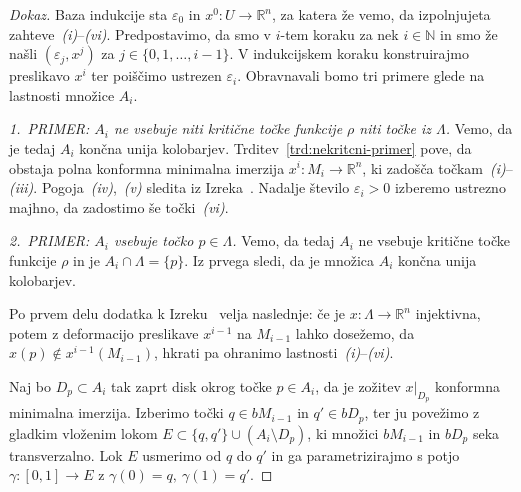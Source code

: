 \documentclass[12pt,a4paper,twoside]{article}
\theoremstyle{definition} %
\newenvironment{dokaz}[1][Dokaz]{\begin{proof}[#1]}{\end{proof}}
\theoremstyle{plain} %
\numberwithin{equation}{section}  %
\begin{document}
\begin{dokaz}
Baza indukcije sta $\varepsilon_0$ in $x^{0} \colon U \to \mathbb{R}^{n}$, za katera že vemo, da izpolnjujeta zahteve~\textit{(i)}--\textit{(vi)}. \newline
Predpostavimo, da smo v $i$-tem koraku za nek $i \in \mathbb{N}$ in smo že našli $(\varepsilon_{j}, x^{j})$ za $j \in \{ 0, 1, \dots , i-1 \}$. V indukcijskem koraku konstruirajmo preslikavo $x^{i}$ ter poiščimo ustrezen $\varepsilon_{i}$.
Obravnavali bomo tri primere glede na lastnosti množice $A_{i}$. \newline

\textit{1.~PRIMER: $A_{i}$ ne vsebuje niti kritične točke funkcije $\rho$ niti točke iz $\Lambda$.} \newline
Vemo, da je tedaj $A_{i}$ končna unija kolobarjev. Trditev~\ref{trd:nekritcni-primer} pove, da obstaja polna konformna minimalna imerzija $x^{i} \colon M_{i} \to \mathbb{R}^{n}$, ki zadošča točkam~\textit{(i)}--\textit{(iii)}.
Pogoja~\textit{(iv)},~\textit{(v)} sledita iz Izreka~\cite[Theorem~3.4.1]{alarcon2021minimal}.
Nadalje število $\varepsilon_{i} > 0$ izberemo ustrezno majhno, da zadostimo še točki~\textit{(vi)}. \newline

\textit{2.~PRIMER: $A_{i}$ vsebuje točko $p \in \Lambda$.} \newline
Vemo, da tedaj $A_{i}$ ne vsebuje kritične točke funkcije $\rho$ in je $A_{i} \cap \Lambda = \{p\}$. Iz prvega sledi, da je množica $A_{i}$ končna unija kolobarjev.

Po prvem delu dodatka k Izreku~\cite[Theorem~3.4.1]{alarcon2021minimal}
velja naslednje: če je $x \colon \Lambda \to \mathbb{R}^{n}$ injektivna, potem z deformacijo preslikave $x^{i-1}$ na $M_{i-1}$ lahko dosežemo, da $x(p) \notin x^{i-1}(M_{i-1})$, hkrati pa ohranimo lastnosti~\textit{(i)}--\textit{(vi)}.

Naj bo $D_{p} \subset A_{i}$ tak zaprt disk okrog točke $p \in A_{i}$, da je zožitev $x|_{D_{p}}$ konformna minimalna imerzija.
Izberimo točki $q \in bM_{i-1}$ in $q' \in bD_{p}$, ter ju povežimo z gladkim vloženim lokom $E \subset \{q,q'\} \cup (A_{i} \setminus D_{p})$, ki množici $bM_{i-1}$ in $bD_{p}$ seka transverzalno. Lok $E$ usmerimo od $q$ do $q'$ in ga parametrizirajmo s potjo $\gamma \colon [0,1] \to E$ z $\gamma(0)=q, \ \gamma(1)=q'$.


\end{dokaz}
\end{document}
